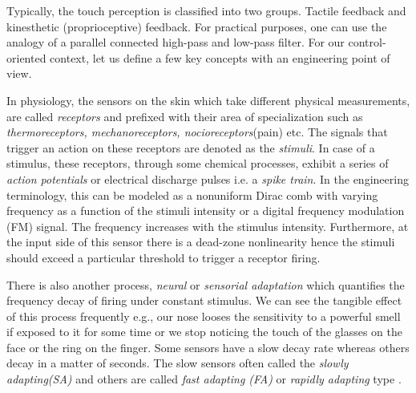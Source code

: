 Typically, the touch perception is classified into two groups. Tactile feedback and kinesthetic (proprioceptive) feedback. For practical purposes, one can use the analogy of a parallel connected high-pass and low-pass filter. For our control-oriented context, let us define a few key concepts with an engineering point of view. 

In physiology, the sensors on the skin which take different physical measurements, are called \emph{receptors} and prefixed with their area of specialization such as \emph{thermoreceptors, mechanoreceptors, nocioreceptors}(pain) etc. The signals that trigger an action on these receptors are denoted as the \emph{stimuli}. In case of a stimulus, these receptors, through some chemical processes, exhibit a series of \emph{action potentials} or electrical discharge pulses i.e. a \emph{spike train}. In the engineering terminology, this can be modeled as a nonuniform Dirac comb with varying frequency as a function of the stimuli intensity or a digital frequency modulation (FM) signal. The frequency increases with the stimulus intensity. Furthermore, at the input side of this sensor there is a dead-zone nonlinearity hence the stimuli should exceed a particular threshold to trigger a receptor firing.

There is also another process, \emph{neural} or \emph{sensorial adaptation} which quantifies the frequency decay of firing under constant stimulus. We can see the tangible effect of this process frequently e.g., our nose looses the sensitivity to a powerful smell if exposed to it for some time or we stop noticing the touch of the glasses on the face or the ring on the finger. Some sensors have a slow decay rate whereas others decay in a matter of seconds. The slow sensors often called the \emph{slowly adapting(SA)} and others are called \emph{fast adapting (FA)} or \emph{rapidly adapting} type \cite{burdea}.


